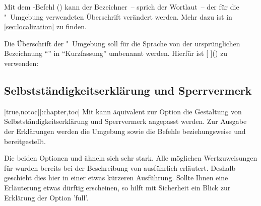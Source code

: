 \begin{Declaration*}{}
\begin{Declaration*}{}
\begin{Declaration*}{}
Mit dem \KOMAScript-Befehl ()
kann der Bezeichner~-- sprich der Wortlaut~-- der für die 
"~Umgebung verwendeten Überschrift verändert werden. Mehr 
dazu ist in \autoref{sec:localization} zu finden.
%
\begin{Example}
Die Überschrift der "~Umgebung soll für die Sprache 
 von der ursprünglichen Bezeichnung \enquote{\abstractname} in 
\enquote{Kurzfassung} umbenannt werden. Hierfür ist 
[%
]() zu verwenden:
\begin{Code}[escapechar=§]
\end{Code}
%
\end{Example}


\subsection{Selbstständigkeitserklärung und Sperrvermerk}
%
%
%
\begin{Declaration}[%
  v2.02!\Option{declaration=multiple}:ersetzt \Option{declaration=double}'none';
  v2.02!\Option{declaration=tocleveldown};%
  v2.02!\Option{declaration=markboth};%
  v2.04!\Option{declaration=tocmultiple}%
]{}[true,notoc][:chapter,toc]%
\printdeclarationlist%
%
Mit  kann äquivalent zur Option  die 
Gestaltung von Selbstständigkeitserklärung und Sperrvermerk angepasst werden.
Zur Ausgabe der Erklärungen werden die Umgebung  
sowie die Befehle  beziehungsweise  und 
 bereitgestellt. 

Die beiden Optionen  und  ähneln sich sehr 
stark. Alle möglichen Wertzuweisungen für  wurden bereits 
bei der Beschreibung von  ausführlich erläutert. Deshalb 
geschieht dies hier in einer etwas kürzeren Ausführung. Sollte Ihnen eine 
Erläuterung etwas dürftig erscheinen, so hilft mit Sicherheit ein Blick zur 
Erklärung der Option 'full'.


\end{Declaration}
\end{Declaration*}
\end{Declaration*}
\end{Declaration*}
